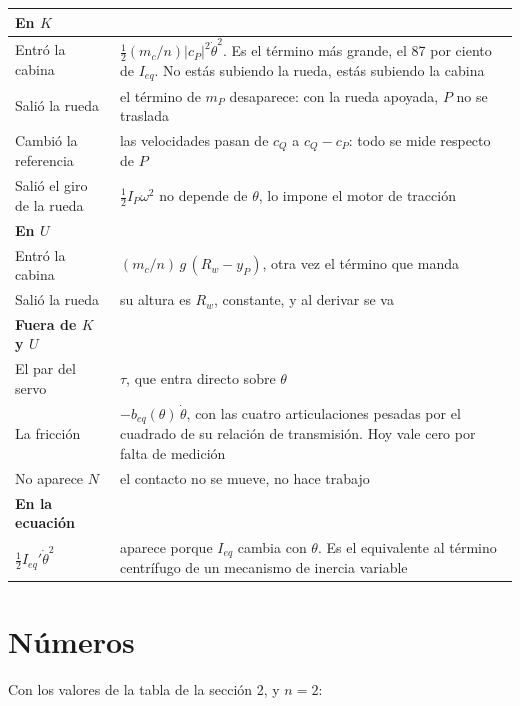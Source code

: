 \documentclass[11pt,a4paper]{article}
\begin{document}
\begin{center}\small
\begin{tabular}{l p{10.6cm}}
\toprule
\textbf{En \(K\)} & \\
\midrule
Entró la cabina & \(\tfrac12(m_c/n)|c_P|^2\dot\theta^2\). Es el término más grande, el 87 por ciento de
  \(I_{eq}\). No estás subiendo la rueda, estás subiendo la cabina \\
Salió la rueda & el término de \(m_P\) desaparece: con la rueda apoyada, \(P\) no se traslada \\
Cambió la referencia & las velocidades pasan de \(c_Q\) a \(c_Q-c_P\): todo se mide respecto de \(P\) \\
Salió el giro de la rueda & \(\tfrac12 I_P\omega^2\) no depende de \(\theta\), lo impone el motor de tracción \\
\midrule
\textbf{En \(U\)} & \\
\midrule
Entró la cabina & \((m_c/n)\,g\,(R_w-y_P)\), otra vez el término que manda \\
Salió la rueda & su altura es \(R_w\), constante, y al derivar se va \\
\midrule
\textbf{Fuera de \(K\) y \(U\)} & \\
\midrule
El par del servo & \(\tau\), que entra directo sobre \(\theta\) \\
La fricción & \(-b_{eq}(\theta)\,\dot\theta\), con las cuatro articulaciones pesadas por el cuadrado de su
  relación de transmisión. Hoy vale cero por falta de medición \\
No aparece \(N\) & el contacto no se mueve, no hace trabajo \\
\midrule
\textbf{En la ecuación} & \\
\midrule
\(\tfrac12 I_{eq}'\dot\theta^2\) & aparece porque \(I_{eq}\) cambia con \(\theta\). Es el equivalente al
  término centrífugo de un mecanismo de inercia variable \\
\bottomrule
\end{tabular}
\end{center}

\section{Números}

Con los valores de la tabla de la sección 2, y \(n=2\):
\end{document}
